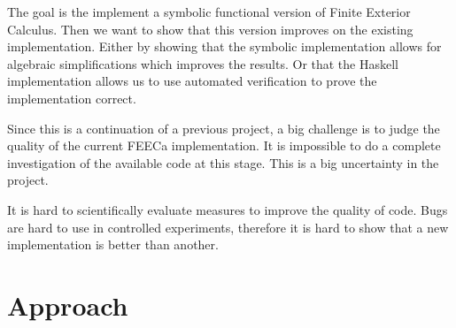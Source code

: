 \documentclass{scrartcl}
\begin{document}
The goal is the implement a symbolic functional version of Finite Exterior
Calculus.  Then we want to show that this version improves on the existing
implementation.  Either by showing that the symbolic implementation allows for
algebraic simplifications which improves the results. Or that the Haskell
implementation allows us to use automated verification to prove the
implementation correct.



Since this is a continuation of a previous project, a big challenge is to judge the quality
of the current FEECa implementation.
It is impossible to do a complete investigation of the available code at this stage.
This is a big uncertainty in the project.

It is hard to scientifically evaluate measures to improve the quality of code.
Bugs are hard to use in controlled experiments, therefore it is hard to show
that a new implementation is better than another.



\section{Approach}


\end{document}
